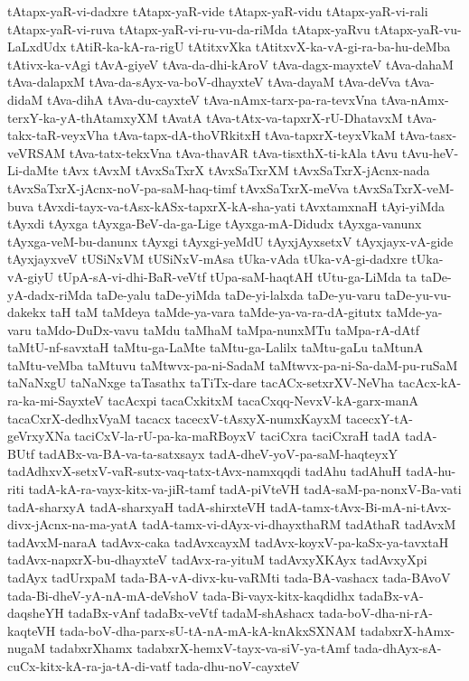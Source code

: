 {tAtapx-yaR-vi-dadxre
tAtapx-yaR-vide
tAtapx-yaR-vidu
tAtapx-yaR-vi-rali
tAtapx-yaR-vi-ruva
tAtapx-yaR-vi-ru-vu-da-riMda
tAtapx-yaRvu
tAtapx-yaR-vu-LaLxdUdx
tAtiR-ka-kA-ra-rigU
tAtitxvXka
tAtitxvX-ka-vA-gi-ra-ba-hu-deMba
tAtivx-ka-vAgi
tAvA-giyeV
tAva-da-dhi-kAroV
tAva-dagx-mayxteV
tAva-dahaM
tAva-dalapxM
tAva-da-sAyx-va-boV-dhayxteV
tAva-dayaM
tAva-deVva
tAva-didaM
tAva-dihA
tAva-du-cayxteV
tAva-nAmx-tarx-pa-ra-tevxVna
tAva-nAmx-terxY-ka-yA-thAtamxyXM
tAvatA
tAva-tAtx-va-tapxrX-rU-DhatavxM
tAva-takx-taR-veyxVha
tAva-tapx-dA-thoVRkitxH
tAva-tapxrX-teyxVkaM
tAva-tasx-veVRSAM
tAva-tatx-tekxVna
tAva-thavAR
tAva-tisxthX-ti-kAla
tAvu
tAvu-heV-Li-daMte
tAvx
tAvxM
tAvxSaTxrX
tAvxSaTxrXM
tAvxSaTxrX-jAcnx-nada
tAvxSaTxrX-jAcnx-noV-pa-saM-haq-timf
tAvxSaTxrX-meVva
tAvxSaTxrX-veM-buva
tAvxdi-tayx-va-tAsx-kASx-tapxrX-kA-sha-yati
tAvxtamxnaH
tAyi-yiMda
tAyxdi
tAyxga
tAyxga-BeV-da-ga-Lige
tAyxga-mA-Didudx
tAyxga-vanunx
tAyxga-veM-bu-danunx
tAyxgi
tAyxgi-yeMdU
tAyxjAyxsetxV
tAyxjayx-vA-gide
tAyxjayxveV
tUSiNxVM
tUSiNxV-mAsa
tUka-vAda
tUka-vA-gi-dadxre
tUka-vA-giyU
tUpA-sA-vi-dhi-BaR-veVtf
tUpa-saM-haqtAH
tUtu-ga-LiMda
ta
taDe-yA-dadx-riMda
taDe-yalu
taDe-yiMda
taDe-yi-lalxda
taDe-yu-varu
taDe-yu-vu-dakekx
taH
taM
taMdeya
taMde-ya-vara
taMde-ya-va-ra-dA-gitutx
taMde-ya-varu
taMdo-DuDx-vavu
taMdu
taMhaM
taMpa-nunxMTu
taMpa-rA-dAtf
taMtU-nf-savxtaH
taMtu-ga-LaMte
taMtu-ga-Lalilx
taMtu-gaLu
taMtunA
taMtu-veMba
taMtuvu
taMtwvx-pa-ni-SadaM
taMtwvx-pa-ni-Sa-daM-pu-ruSaM
taNaNxgU
taNaNxge
taTasathx
taTiTx-dare
tacACx-setxrXV-NeVha
tacAcx-kA-ra-ka-mi-SayxteV
tacAcxpi
tacaCxkitxM
tacaCxqq-NevxV-kA-garx-manA
tacaCxrX-dedhxVyaM
tacacx
tacecxV-tAsxyX-numxKayxM
tacecxY-tA-geVrxyXNa
taciCxV-la-rU-pa-ka-maRBoyxV
taciCxra
taciCxraH
tadA
tadA-BUtf
tadABx-va-BA-va-ta-satxsayx
tadA-dheV-yoV-pa-saM-haqteyxY
tadAdhxvX-setxV-vaR-sutx-vaq-tatx-tAvx-namxqqdi
tadAhu
tadAhuH
tadA-hu-riti
tadA-kA-ra-vayx-kitx-va-jiR-tamf
tadA-piVteVH
tadA-saM-pa-nonxV-Ba-vati
tadA-sharxyA
tadA-sharxyaH
tadA-shirxteVH
tadA-tamx-tAvx-Bi-mA-ni-tAvx-divx-jAcnx-na-ma-yatA
tadA-tamx-vi-dAyx-vi-dhayxthaRM
tadAthaR
tadAvxM
tadAvxM-naraA
tadAvx-caka
tadAvxcayxM
tadAvx-koyxV-pa-kaSx-ya-tavxtaH
tadAvx-napxrX-bu-dhayxteV
tadAvx-ra-yituM
tadAvxyXKAyx
tadAvxyXpi
tadAyx
tadUrxpaM
tada-BA-vA-divx-ku-vaRMti
tada-BA-vashacx
tada-BAvoV
tada-Bi-dheV-yA-nA-mA-deVshoV
tada-Bi-vayx-kitx-kaqdidhx
tadaBx-vA-daqsheYH
tadaBx-vAnf
tadaBx-veVtf
tadaM-shAshacx
tada-boV-dha-ni-rA-kaqteVH
tada-boV-dha-parx-sU-tA-nA-mA-kA-knAkxSXNAM
tadabxrX-hAmx-nugaM
tadabxrXhamx
tadabxrX-hemxV-tayx-va-siV-ya-tAmf
tada-dhAyx-sA-cuCx-kitx-kA-ra-ja-tA-di-vatf
tada-dhu-noV-cayxteV
}
